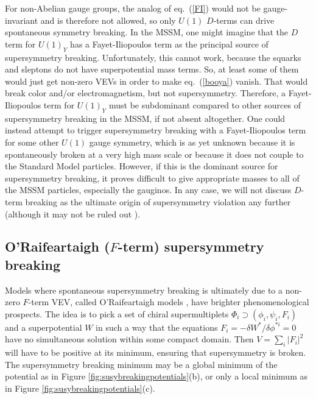 \documentclass[12pt]{article}
\begin{document}
For non-Abelian gauge groups, the analog of eq.~(\ref{FI}) would not be
gauge-invariant and is therefore not allowed, so only $U(1)$ $D$-terms can
drive spontaneous symmetry breaking. In the MSSM, one might imagine that
the $D$ term for $U(1)_Y$ has a Fayet-Iliopoulos term as the principal
source of supersymmetry breaking. Unfortunately, this cannot work, because
the squarks and sleptons do not have superpotential mass terms. So, at
least some of them would just get non-zero VEVs in order to make
eq.~(\ref{booya}) vanish. That would break color and/or electromagnetism,
but not supersymmetry. Therefore, a Fayet-Iliopoulos term for $U(1)_Y$
must be subdominant compared to other sources of supersymmetry breaking in
the MSSM, if not absent altogether. One could instead attempt to trigger
supersymmetry breaking with a Fayet-Iliopoulos term for some other $U(1)$
gauge symmetry, which is as yet unknown because it is spontaneously broken
at a very high mass scale or because it does not couple to the Standard
Model particles. However, if this is the dominant source for supersymmetry
breaking, it proves difficult to give appropriate masses to all of the
MSSM particles, especially the gauginos. In any case, we will not discuss
$D$-term breaking as the ultimate origin of supersymmetry violation any
further (although it may not be ruled out \cite{dtermbreakingmaywork}).

\subsection{O'Raifeartaigh ($F$-term) supersymmetry breaking
\label{subsec:origins.Fterm}}
\setcounter{equation}{0}
\setcounter{footnote}{1}

Models where spontaneous supersymmetry breaking is ultimately due to a
non-zero $F$-term VEV, called O'Rai\-f\-ear\-taigh models
\cite{ORaifeartaigh}, have brighter phenomenological prospects. The idea
is to pick a set of chiral supermultiplets $\Phi_i\supset (\phi_i, \psi_i,
F_i)$ and a superpotential $W$ in such a way that the equations $F_i =
-\delta W^*/\delta \phi^{*i} = 0$ have no simultaneous solution within some
compact domain. Then
$V=\sum_i |F_i|^2$ will have to be positive at its minimum, ensuring that
supersymmetry is broken. The supersymmetry breaking minimum may be 
a global minimum of the potential as in Figure \ref{fig:susybreakingpotentials}(b), or only
a local minimum as in Figure \ref{fig:susybreakingpotentials}(c).
\end{document}

